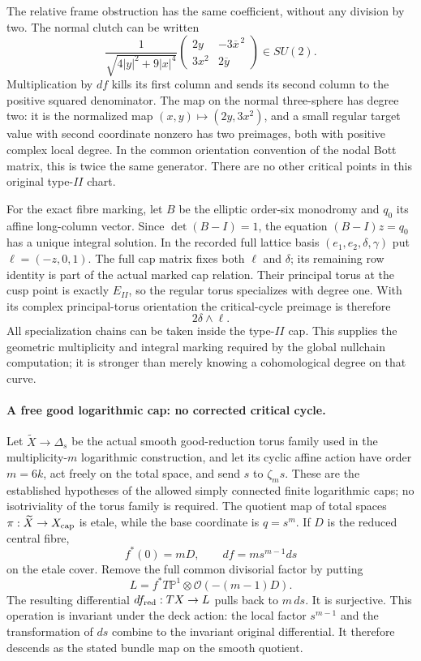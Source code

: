 The relative frame obstruction has the same coefficient,
without any division by two.  The normal clutch can be written
\[
 \frac1{\sqrt{4|y|^2+9|x|^4}}
   \begin{pmatrix}2y&-3\overline{x}^{\,2}\\
                   3x^2&2\overline y\end{pmatrix}\in SU(2).
 \tag{D.IIF4}
\]
Multiplication by $df$ kills its first column and sends its
second column to the positive squared denominator.
The map on the normal three-sphere has degree two: it is the
normalized map $(x,y)\mapsto(2y,3x^2)$, and a small regular
target value with second coordinate nonzero has two preimages,
both with positive complex local degree.  In the common
orientation convention of the nodal Bott matrix, this is twice
the same generator.  There are no other critical points in
this original type-$II$ chart.

For the exact fibre marking, let $B$ be the elliptic order-six
monodromy and $q_0$ its affine long-column vector.  Since
$\det(B-I)=1$, the equation $(B-I)z=q_0$ has a unique integral
solution.  In the recorded full lattice basis
$(e_1,e_2,\delta,\gamma)$ put
$\ell=(-z,0,1)$.  The full cap matrix fixes both $\ell$ and
$\delta$; its remaining row identity is part of the actual
marked cap relation.  Their principal torus at the cusp point
is exactly $E_{II}$, so the regular torus specializes with
degree one.  With its complex principal-torus orientation the
critical-cycle preimage is therefore
\[
                             2\delta\wedge\ell.
 \tag{D.IIF5}
\]
All specialization chains can be taken inside the type-$II$
cap.  This supplies the geometric multiplicity and integral
marking required by the global nullchain computation; it is
stronger than merely knowing a cohomological degree on that
curve.

\paragraph{A free good logarithmic cap: no corrected critical cycle.}
Let $\widetilde X\to\Delta_s$ be the actual smooth good-reduction
torus family used in the multiplicity-$m$ logarithmic construction,
and let its cyclic affine action have order $m=6k$, act freely
on the total space, and send $s$ to $\zeta_m s$.
These are the established hypotheses of the allowed simply
connected finite logarithmic caps; no isotriviality of the
torus family is required.  The quotient map of total spaces
$\pi:\widetilde X\to X_{\rm cap}$ is etale, while the base
coordinate is $q=s^m$.  If $D$ is the reduced central fibre,
\[
                   f^*(0)=mD,\qquad
                   df=m s^{m-1}ds
 \tag{D.IIF6}
\]
on the etale cover.  Remove the full common divisorial factor
by putting
\[
          L=f^*T\mathbb P^1\otimes\mathcal O(-(m-1)D).
 \tag{D.IIF7}
\]
The resulting differential $df_{\rm red}:TX\to L$ pulls back
to $m\,ds$.  It is surjective.  This operation is invariant
under the deck action: the local factor $s^{m-1}$ and the
transformation of $ds$ combine to the invariant original
differential.  It therefore descends as the stated bundle
map on the smooth quotient.

